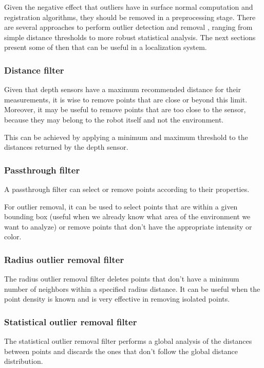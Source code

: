 Given the negative effect that outliers have in surface normal computation and registration algorithms, they should be removed in a preprocessing stage. There are several approaches to perform outlier detection and removal \cite{YangZhang2010}, ranging from simple distance thresholds to more robust statistical analysis. The next sections present some of then that can be useful in a localization system.


\subsubsection{Distance filter}

Given that depth sensors have a maximum recommended distance for their measurements, it is wise to remove points that are close or beyond this limit. Moreover, it may be useful to remove points that are too close to the sensor, because they may belong to the robot itself and not the environment.

This can be achieved by applying a minimum and maximum threshold to the distances returned by the depth sensor.


\subsubsection{Passthrough filter}

A passthrough filter can select or remove points according to their properties.

For outlier removal, it can be used to select points that are within a given bounding box (useful when we already know what area of the environment we want to analyze) or remove points that don't have the appropriate intensity or color.


\subsubsection{Radius outlier removal filter}

The radius outlier removal filter deletes points that don't have a minimum number of neighbors within a specified radius distance. It can be useful when the point density is known and is very effective in removing isolated points.


\subsubsection{Statistical outlier removal filter}

The statistical outlier removal filter \cite{Rusu2010a} performs a global analysis of the distances between points and discards the ones that don't follow the global distance distribution.

